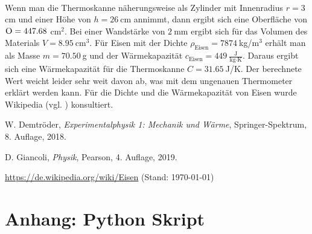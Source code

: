 \documentclass{article}
\begin{document}
~

Wenn man die Thermoskanne näherungsweise als Zylinder mit Innenradius $r=3~$cm und einer Höhe von $h=26~$cm annimmt, dann ergibt sich eine Oberfläche von $\textsc{O} = 447.68~$cm${}^2$. Bei einer Wandstärke von $2~$mm ergibt sich für das Volumen des Materials $V=8.95~$cm${}^3$. Für Eisen mit der Dichte $\rho_\text{Eisen} = 7874~$kg/m${}^3$ erhält man als Masse $m=70.50~$g und der Wärmekapazität $c_\text{Eisen} = 449~\frac{\text{J}}{\text{kg}\cdot\text{K}}$. Daraus ergibt sich eine Wärmekapazität für die Thermoskanne $C = 31.65~$J/K. Der berechnete Wert weicht leider sehr weit davon ab, was mit dem ungenauen Thermometer erklärt werden kann. Für die Dichte und die Wärmekapazität von Eisen wurde Wikipedia (vgl. \cite{wiki_eisen}) konsultiert.



\begin{thebibliography}{9}
 W. Demtröder, \emph{Experimentalphysik 1: Mechanik und Wärme}, Springer-Spektrum, 8. Auflage, 2018.

 D. Giancoli, \emph{Physik}, Pearson, 4. Auflage, 2019.

 \url{https://de.wikipedia.org/wiki/Eisen} (Stand: \today)
\end{thebibliography}



\section*{Anhang: Python Skript}


% 
\newpage






\end{document}
